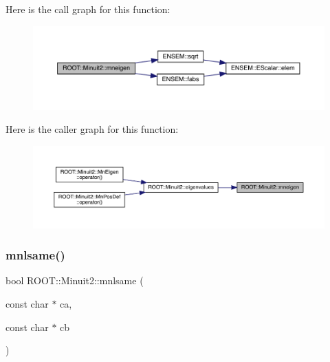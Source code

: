 Here is the call graph for this function\+:
\nopagebreak
\begin{figure}[H]
\begin{center}
\leavevmode
\includegraphics[width=350pt]{d6/d3a/namespaceROOT_1_1Minuit2_a4a6b91c57b107c48f582569401bb12e9_cgraph}
\end{center}
\end{figure}
Here is the caller graph for this function\+:
\nopagebreak
\begin{figure}[H]
\begin{center}
\leavevmode
\includegraphics[width=350pt]{d6/d3a/namespaceROOT_1_1Minuit2_a4a6b91c57b107c48f582569401bb12e9_icgraph}
\end{center}
\end{figure}
\mbox{\label{namespaceROOT_1_1Minuit2_a3f90b826c2c1b4313f9a90c22b8ee657}} 
\subsubsection{\texorpdfstring{mnlsame()}{mnlsame()}}
{\footnotesize\ttfamily bool R\+O\+O\+T\+::\+Minuit2\+::mnlsame (\begin{DoxyParamCaption}\item[{const char $\ast$}]{ca,  }\item[{const char $\ast$}]{cb }\end{DoxyParamCaption})}

